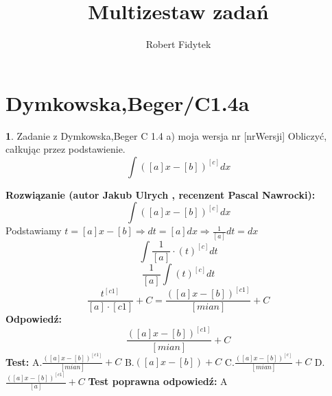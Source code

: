\documentclass[12pt, a4paper]{article}
\title{Multizestaw zadań}
\author{Robert Fidytek}
\date{}
\theoremstyle{definition} %
\newtheorem{zad}{}
\newcommand{\kategoria}[1]{\section{#1}} %
\newcommand{\zadStart}[1]{\begin{zad}#1\newline} %
\newcommand{\zadStop}{\end{zad}}   %
\newcommand{\rozwStart}[2]{\noindent \textbf{Rozwiązanie (autor #1 , recenzent #2): }\newline} %
\newcommand{\rozwStop}{\newline}                                            %
\newcommand{\odpStart}{\noindent \textbf{Odpowiedź:}\newline}    %
\newcommand{\odpStop}{\newline}                                             %
\newcommand{\testStart}{\noindent \textbf{Test:}\newline} %
\newcommand{\testStop}{\newline} %
\newcommand{\kluczStart}{\noindent \textbf{Test poprawna odpowiedź:}\newline} %
\newcommand{\kluczStop}{\newline} %
\begin{document}
\maketitle


\kategoria{Dymkowska,Beger/C1.4a}
\zadStart{Zadanie z Dymkowska,Beger C 1.4 a) moja wersja nr [nrWersji]}
Obliczyć, całkując przez podstawienie.$$\int([a]x-[b])^{[c]}dx$$
\zadStop
\rozwStart{Jakub Ulrych}{Pascal Nawrocki}
$$\int([a]x-[b])^{[c]}dx$$
Podstawiamy $t=[a]x-[b]\Rightarrow dt=[a]dx \Rightarrow\frac{1}{[a]}dt=dx$
$$\int\frac{1}{[a]}\cdot(t)^{[c]}dt$$
$$\frac{1}{[a]}\int(t)^{[c]}dt$$
$$\frac{t^{[c1]}}{[a]\cdot[c1]}+C=\frac{([a]x-[b])^{[c1]}}{[mian]}+C$$
\rozwStop
\odpStart
$$\frac{([a]x-[b])^{[c1]}}{[mian]}+C$$
\odpStop
\testStart
A.$\frac{([a]x-[b])^{[c1]}}{[mian]}+C$
B.$([a]x-[b])+C$
C.$\frac{([a]x-[b])^{[c]}}{[mian]}+C$
D.$\frac{([a]x-[b])^{[c1]}}{[a]}+C$
\testStop
\kluczStart
A
\kluczStop
\end{document}
